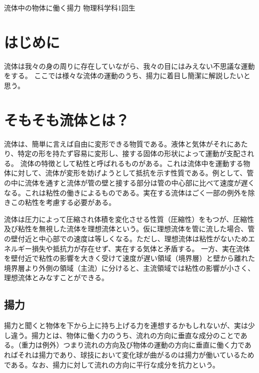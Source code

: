 \documentclass[10pt,b5paper,papersize,dvipdfmx]{jsbook}
\begin{document}


\kaishititle%
  {流体中の物体に働く揚力}%
  {物理科学科1回生}%
  {}%

%
\section*{はじめに}
流体は我々の身の周りに存在していながら、我々の目にはみえない不思議な運動をする。
ここでは様々な流体の運動のうち、揚力に着目し簡潔に解説したいと思う。
\par
\section{そもそも流体とは？}
流体は、簡単に言えば自由に変形できる物質である。液体と気体がそれにあたり、特定の形を持たず容易に変形し、接する固体の形状によって運動が支配される。
流体の特徴として粘性と呼ばれるものがある。これは流体中を運動する物体に対して、流体が変形を妨げようとして抵抗を示す性質である。例として、管の中に流体を通すと流体が管の壁と接する部分は管の中心部に比べて速度が遅くなる。これは粘性の働きによるものである。実在する流体はごく一部の例外を除きこの粘性を考慮する必要がある。
\par
流体は圧力によって圧縮され体積を変化させる性質（圧縮性）をもつが、圧縮性及び粘性を無視した流体を理想流体という。仮に理想流体を管に流した場合、管の壁付近と中心部での速度は等しくなる。ただし、理想流体は粘性がないためエネルギー損失や抵抗力が存在せず、実在する気体と矛盾する。
一方、実在流体を壁付近で粘性の影響を大きく受けて速度が遅い領域（境界層）と壁から離れた境界層より外側の領域（主流）に分けると、主流領域では粘性の影響が小さく、理想流体とみなすことができる。
\par
\subsection{揚力}
揚力と聞くと物体を下から上に持ち上げる力を連想するかもしれないが、実は少し違う。揚力とは、物体に働く力のうち、流れの方向に垂直な成分のことである。（重力は例外）つまり流れの方向及び物体の運動の方向に垂直に働く力であればそれは揚力であり、球技において変化球が曲がるのは揚力が働いているためである。なお、揚力に対して流れの方向に平行な成分を抗力という。
\par
\end{document}
